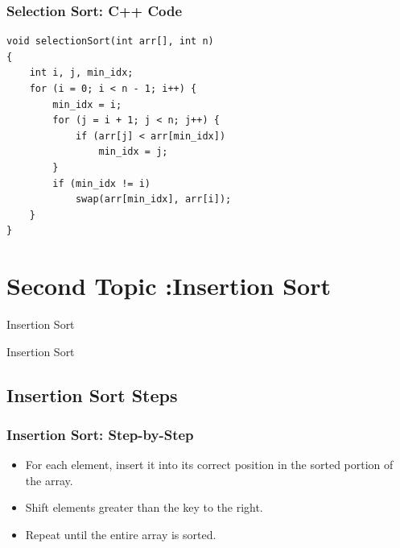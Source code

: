 \documentclass{beamer}
\begin{document}
\begin{frame}[c, fragile]
\frametitle{Selection Sort: C++ Code}

\begin{mybox}  %
\begin{verbatim}
void selectionSort(int arr[], int n) 
{ 
    int i, j, min_idx; 
    for (i = 0; i < n - 1; i++) { 
        min_idx = i; 
        for (j = i + 1; j < n; j++) { 
            if (arr[j] < arr[min_idx]) 
                min_idx = j; 
        } 
        if (min_idx != i) 
            swap(arr[min_idx], arr[i]); 
    } 
}
\end{verbatim}
\end{mybox}

\end{frame}

\section{Second Topic :Insertion Sort}
\begin{frame}{Insertion Sort}
  \begin{center}
    \Huge Insertion Sort
  \end{center}
\end{frame}

\subsection{Insertion Sort Steps}
\begin{frame}[c, fragile]
  \frametitle{Insertion Sort: Step-by-Step}

  \begin{itemize}
    \item For each element, insert it into its correct position in the sorted portion of the array.
    \item Shift elements greater than the key to the right.
    \item Repeat until the entire array is sorted.
  \end{itemize}

\end{frame}
\end{document}
